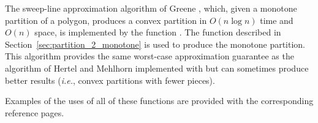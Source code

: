 The sweep-line approximation algorithm of Greene \cite{g-dpcp-83}, which, 
given a monotone partition of a polygon, produces a convex partition in 
$O(n \log n)$ time and $O(n)$ space, is implemented
by the function %
.  The function
 described in
Section~\ref{sec:partition_2_monotone} is used to produce the monotone
partition.  This algorithm provides the same worst-case approximation guarantee 
as the algorithm of Hertel and Mehlhorn implemented with
 but can sometimes produce better
results ({\em i.e.}, convex partitions with fewer pieces).

Examples of the uses of all of these functions are provided with the
corresponding reference pages.
